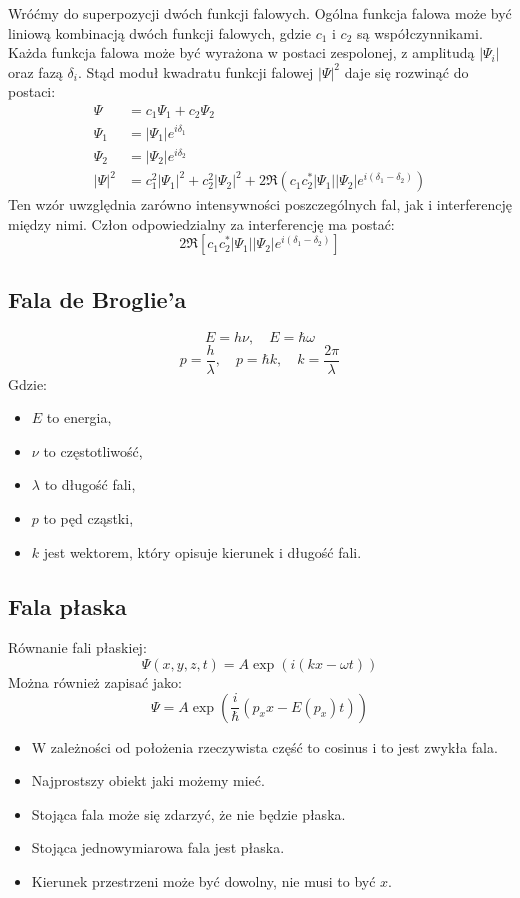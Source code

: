 Wróćmy do superpozycji dwóch funkcji falowych. Ogólna funkcja falowa może być liniową kombinacją dwóch funkcji falowych, gdzie $c_1$ i $c_2$ są współczynnikami.
Każda funkcja falowa może być wyrażona w postaci zespolonej, z amplitudą $|\Psi_i|$ oraz fazą $\delta_i$.
Stąd moduł kwadratu funkcji falowej $|\Psi|^2$ daje się rozwinąć do postaci:
\begin{align*}
\Psi &= c_1 \Psi_1 + c_2 \Psi_2\\
\Psi_1 &= |\Psi_1| e^{i \delta_1}\\
\Psi_2 &= |\Psi_2| e^{i \delta_2}\\
|\Psi|^2 &= c_1^2 |\Psi_1|^2 + c_2^2 |\Psi_2|^2 + 2 \Re (c_1 c_2^* |\Psi_1| |\Psi_2| e^{i (\delta_1 - \delta_2)})
\end{align*}
Ten wzór uwzględnia zarówno intensywności poszczególnych fal, jak i interferencję między nimi. Człon odpowiedzialny za interferencję ma postać:
\begin{equation*}
    2 \Re \left[ c_1 c_2^* |\Psi_1| |\Psi_2| e^{i (\delta_1 - \delta_2)} \right]
\end{equation*}

\subsection{Fala de Broglie'a}
\[
E = h\nu, \quad E = \hbar \omega
\]
\[
p = \frac{h}{\lambda}, \quad p = \hbar k, \quad k = \frac{2\pi}{\lambda}
\]
Gdzie:
\begin{itemize}
    \item $E$ to energia,
    \item $\nu$ to częstotliwość,
    \item $\lambda$ to długość fali,
    \item $p$ to pęd cząstki,
    \item $k$ jest wektorem, który opisuje kierunek i długość fali.
\end{itemize}

\subsection{Fala płaska}
Równanie fali płaskiej:
\[
\Psi(x,y,z,t) = A \exp \left( i \left( kx - \omega t \right) \right)
\]
Można również zapisać jako:
\[
\Psi = A \exp \left( \frac{i}{\hbar} (p_x x - E(p_x) t) \right)
\]
\begin{itemize}
    \item W zależności od położenia rzeczywista część to cosinus i to jest zwykła fala.
    \item Najprostszy obiekt jaki możemy mieć.
    \item Stojąca fala może się zdarzyć, że nie będzie płaska.
    \item Stojąca jednowymiarowa fala jest płaska.
    \item Kierunek przestrzeni może być dowolny, nie musi to być $x$.
\end{itemize}

